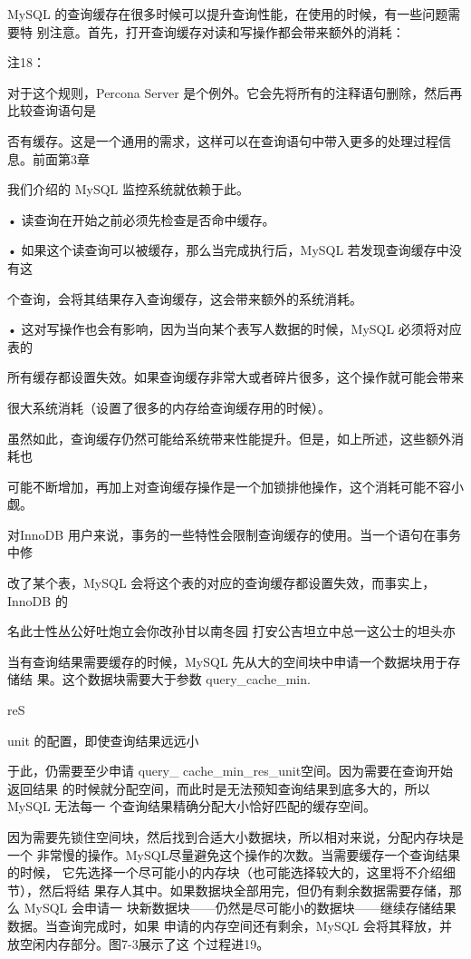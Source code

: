 MySQL 的查询缓存在很多时候可以提升查询性能，在使用的时候，有一些问题需要特
别注意。首先，打开查询缓存对读和写操作都会带来额外的消耗：

注18：

对于这个规则，Percona Server 是个例外。它会先将所有的注释语句删除，然后再比较查询语句是

否有缓存。这是一个通用的需求，这样可以在查询语句中带入更多的处理过程信息。前面第3章

我们介绍的 MySQL 监控系统就依赖于此。

• 读查询在开始之前必须先检查是否命中缓存。

• 如果这个读查询可以被缓存，那么当完成执行后，MySQL 若发现查询缓存中没有这

个查询，会将其结果存入查询缓存，这会带来额外的系统消耗。

• 这对写操作也会有影响，因为当向某个表写人数据的时候，MySQL 必须将对应表的

所有缓存都设置失效。如果查询缓存非常大或者碎片很多，这个操作就可能会带来

很大系统消耗（设置了很多的内存给查询缓存用的时候）。

虽然如此，查询缓存仍然可能给系统带来性能提升。但是，如上所述，这些额外消耗也

可能不断增加，再加上对查询缓存操作是一个加锁排他操作，这个消耗可能不容小觑。

对InnoDB 用户来说，事务的一些特性会限制查询缓存的使用。当一个语句在事务中修

改了某个表，MySQL 会将这个表的对应的查询缓存都设置失效，而事实上，InnoDB 的

名此士性丛公好吐炮立会你改孙甘以南冬园 打安公吉坦立中总一这公士的坦头亦

当有查询结果需要缓存的时候，MySQL 先从大的空间块中申请一个数据块用于存储结
果。这个数据块需要大于参数 query\_cache\_min.

reS

unit 的配置，即使查询结果远远小

于此，仍需要至少申请 query\_ cache\_min\_res\_unit空间。因为需要在查询开始返回结果
的时候就分配空间，而此时是无法预知查询结果到底多大的，所以 MySQL 无法每一
个查询结果精确分配大小恰好匹配的缓存空间。

因为需要先锁住空间块，然后找到合适大小数据块，所以相对来说，分配内存块是一个
非常慢的操作。MySQL尽量避免这个操作的次数。当需要缓存一个查询结果的时候，
它先选择一个尽可能小的内存块（也可能选择较大的，这里将不介绍细节），然后将结
果存人其中。如果数据块全部用完，但仍有剩余数据需要存储，那么 MySQL 会申请一
块新数据块——仍然是尽可能小的数据块——继续存储结果数据。当查询完成时，如果
申请的内存空间还有剩余，MySQL 会将其释放，并放空闲内存部分。图7-3展示了这
个过程进19。

